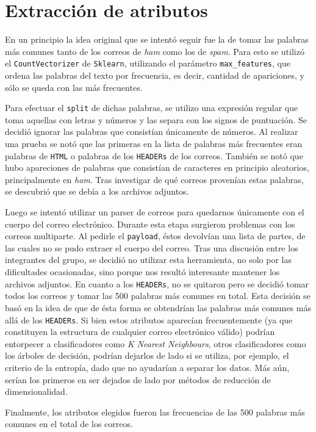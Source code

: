 \section{Extracción de atributos}

En un principio la idea original que se intentó seguir fue la de tomar las palabras más comunes tanto de los correos de \emph{ham} como los de \emph{spam}. Para esto se utilizó el \texttt{CountVectorizer} de \texttt{Sklearn}, utilizando el parámetro \texttt{max\_features}, que ordena las palabras del texto por frecuencia, es decir, cantidad de apariciones, y sólo se queda con las más frecuentes.

Para efectuar el \texttt{split} de dichas palabras, se utilizo una expresión regular que toma aquellas con letras y números y las separa con los signos de puntuación. Se decidió ignorar las palabras que consistían únicamente de números. Al realizar una prueba se notó que las primeras en la lista de palabras más frecuentes eran palabras de \texttt{HTML} o palabras de los \texttt{HEADERs} de los correos. También se notó que hubo apareciones de palabras que consistían de caracteres en principio aleatorios, principalmente en \emph{ham}. Tras investigar de qué correos provenían estas palabras, se descubrió que se debía a los archivos adjuntos.

Luego se intentó utilizar un parser de correos\textsuperscript{\cite{parser}} para quedarnos únicamente con el cuerpo del correo electr\'onico. Durante esta etapa surgieron problemas con los correos multiparte. Al pedirle el \texttt{payload}, éstos devolvían una lista de partes, de las cuales no se pudo extraer el cuerpo del correo. Tras una discusión entre los integrantes del grupo, se decidió no utilizar esta herramienta, no solo por las dificultades ocasionadas, sino porque nos result\'o interesante mantener los archivos adjuntos. En cuanto a los \texttt{HEADERs}, no se quitaron pero se decidió tomar todos los correos y tomar las 500 palabras más comunes en total. Esta decisión se basó en la idea de que de ésta forma se obtendrían las palabras más comunes más allá de los \texttt{HEADERs}. Si bien estos atributos aparec\'ian frecuentemente (ya que constituyen la estructura de cualquier correo electr\'onico v\'alido) podrían entorpecer a clasificadores como \emph{K Nearest Neighbours}, otros clasificadores como los árboles de decisión, podrían dejarlos de lado si se utiliza, por ejemplo, el criterio de la entropía, dado que no ayudarían a separar los datos. Más aún, serían los primeros en ser dejados de lado por métodos de reducción de dimensionalidad.

Finalmente, los atributos elegidos fueron las frecuencias de las 500 palabras más comunes en el total de los correos.